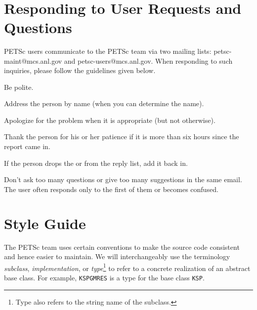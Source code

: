 \newpage
\hbox{ }
\newpage

\tableofcontents

\pagestyle{fancy}
\chapter{Responding to User Requests and Questions}

PETSc users communicate to the PETSc team via two mailing lists:
petsc-maint@mcs.anl.gov and petsc-users@mcs.anl.gov. When responding
to such inquiries, please follow the guidelines given below.

\begin{tightitemize}
\item Be polite.
\item Address the person by name (when you can determine the name).
\item Apologize for the problem when it is appropriate (but not otherwise).
\item Thank the person for his or her patience if it is more than six hours since the report came in.
\item If the person drops the  or  from the reply list, add it back in.
\item Don't ask too many questions or give too many suggestions in the same email. The user often responds only to the first of them or becomes confused.
\end{tightitemize}

\chapter{Style Guide}\label{chapter:styleguide}

The PETSc team uses certain conventions to make the source code consistent and hence easier to maintain. We will interchangeably use the
terminology {\em subclass}, {\em implementation}, or {\em type}\footnote{Type also refers to the string name of the subclass.}
to refer to a concrete realization of an abstract base class. For example, \lstinline{KSPGMRES} is a type for the base class \lstinline{KSP}.

